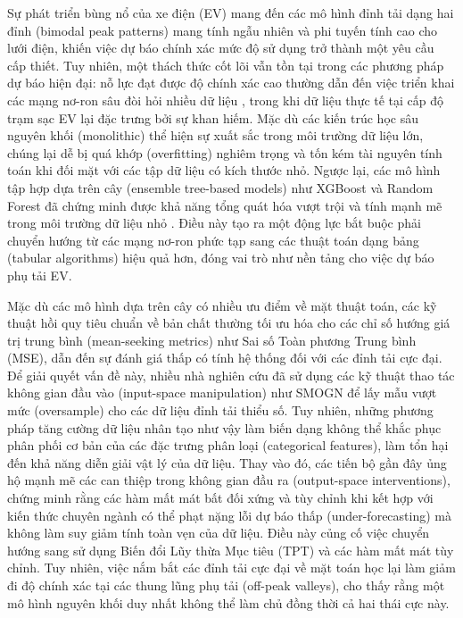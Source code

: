 \documentclass[pdflatex,sn-mathphys-num]{sn-jnl}%
\theoremstyle{thmstyleone}%
\theoremstyle{thmstyletwo}%
\theoremstyle{thmstylethree}%
\begin{document}
Sự phát triển bùng nổ của xe điện (EV) mang đến các mô hình đỉnh tải dạng hai đỉnh (bimodal peak patterns) mang tính ngẫu nhiên và phi tuyến tính cao cho lưới điện, khiến việc dự báo chính xác mức độ sử dụng trở thành một yêu cầu cấp thiết. Tuy nhiên, một thách thức cốt lõi vẫn tồn tại trong các phương pháp dự báo hiện đại: nỗ lực đạt được độ chính xác cao thường dẫn đến việc triển khai các mạng nơ-ron sâu đòi hỏi nhiều dữ liệu \cite{eren2024comprehensive, zhu2019electric}, trong khi dữ liệu thực tế tại cấp độ trạm sạc EV lại đặc trưng bởi sự khan hiếm. Mặc dù các kiến trúc học sâu nguyên khối (monolithic) thể hiện sự xuất sắc trong môi trường dữ liệu lớn, chúng lại dễ bị quá khớp (overfitting) nghiêm trọng và tốn kém tài nguyên tính toán khi đối mặt với các tập dữ liệu có kích thước nhỏ. Ngược lại, các mô hình tập hợp dựa trên cây (ensemble tree-based models) như XGBoost và Random Forest đã chứng minh được khả năng tổng quát hóa vượt trội và tính mạnh mẽ trong môi trường dữ liệu nhỏ \cite{lu2021comparative, wang2020ensemble, shahriar2020machine}. Điều này tạo ra một động lực bắt buộc phải chuyển hướng từ các mạng nơ-ron phức tạp sang các thuật toán dạng bảng (tabular algorithms) hiệu quả hơn, đóng vai trò như nền tảng cho việc dự báo phụ tải EV.

Mặc dù các mô hình dựa trên cây có nhiều ưu điểm về mặt thuật toán, các kỹ thuật hồi quy tiêu chuẩn về bản chất thường tối ưu hóa cho các chỉ số hướng giá trị trung bình (mean-seeking metrics) như Sai số Toàn phương Trung bình (MSE), dẫn đến sự đánh giá thấp có tính hệ thống đối với các đỉnh tải cực đại. Để giải quyết vấn đề này, nhiều nhà nghiên cứu đã sử dụng các kỹ thuật thao tác không gian đầu vào (input-space manipulation) như SMOGN để lấy mẫu vượt mức (oversample) cho các dữ liệu đỉnh tải thiểu số. Tuy nhiên, những phương pháp tăng cường dữ liệu nhân tạo như vậy làm biến dạng không thể khắc phục phân phối cơ bản của các đặc trưng phân loại (categorical features), làm tổn hại đến khả năng diễn giải vật lý của dữ liệu. Thay vào đó, các tiến bộ gần đây ủng hộ mạnh mẽ các can thiệp trong không gian đầu ra (output-space interventions), chứng minh rằng các hàm mất mát bất đối xứng và tùy chỉnh \cite{wu2021support, ko2025deterministic, kim2026methodology} khi kết hợp với kiến thức chuyên ngành có thể phạt nặng lỗi dự báo thấp (under-forecasting) mà không làm suy giảm tính toàn vẹn của dữ liệu. Điều này củng cố việc chuyển hướng sang sử dụng Biến đổi Lũy thừa Mục tiêu (TPT) và các hàm mất mát tùy chỉnh. Tuy nhiên, việc nắm bắt các đỉnh tải cực đại về mặt toán học lại làm giảm đi độ chính xác tại các thung lũng phụ tải (off-peak valleys), cho thấy rằng một mô hình nguyên khối duy nhất không thể làm chủ đồng thời cả hai thái cực này.
\end{document}
